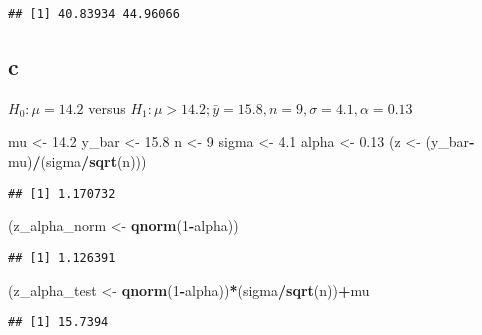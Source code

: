 \documentclass[]{article}
\newenvironment{Shaded}{\begin{snugshade}}{\end{snugshade}}
\newcommand{\KeywordTok}[1]{\textcolor[rgb]{0.13,0.29,0.53}{\textbf{#1}}}
\newcommand{\DecValTok}[1]{\textcolor[rgb]{0.00,0.00,0.81}{#1}}
\newcommand{\FloatTok}[1]{\textcolor[rgb]{0.00,0.00,0.81}{#1}}
\newcommand{\StringTok}[1]{\textcolor[rgb]{0.31,0.60,0.02}{#1}}
\newcommand{\OperatorTok}[1]{\textcolor[rgb]{0.81,0.36,0.00}{\textbf{#1}}}
\newcommand{\NormalTok}[1]{#1}
\begin{document}
\begin{verbatim}
## [1] 40.83934 44.96066
\end{verbatim}

\subsection{c}\label{c}

\(H_0 : \mu=14.2\) versus
\(H_1 : \mu > 14.2 ; \bar{y}=15.8 , n=9, \sigma = 4.1 , \alpha= 0.13\)

\begin{Shaded}
\begin{Highlighting}[]
\NormalTok{mu <-}\StringTok{ }\FloatTok{14.2}
\NormalTok{y_bar <-}\StringTok{ }\FloatTok{15.8}
\NormalTok{n <-}\StringTok{ }\DecValTok{9}
\NormalTok{sigma <-}\StringTok{ }\FloatTok{4.1}
\NormalTok{alpha <-}\StringTok{ }\FloatTok{0.13}
\NormalTok{(z <-}\StringTok{ }\NormalTok{(y_bar}\OperatorTok{-}\NormalTok{mu)}\OperatorTok{/}\NormalTok{(sigma}\OperatorTok{/}\KeywordTok{sqrt}\NormalTok{(n)))}
\end{Highlighting}
\end{Shaded}

\begin{verbatim}
## [1] 1.170732
\end{verbatim}

\begin{Shaded}
\begin{Highlighting}[]
\NormalTok{(z_alpha_norm <-}\StringTok{ }\KeywordTok{qnorm}\NormalTok{(}\DecValTok{1}\OperatorTok{-}\NormalTok{alpha))}
\end{Highlighting}
\end{Shaded}

\begin{verbatim}
## [1] 1.126391
\end{verbatim}

\begin{Shaded}
\begin{Highlighting}[]
\NormalTok{(z_alpha_test <-}\StringTok{ }\KeywordTok{qnorm}\NormalTok{(}\DecValTok{1}\OperatorTok{-}\NormalTok{alpha))}\OperatorTok{*}\NormalTok{(sigma}\OperatorTok{/}\KeywordTok{sqrt}\NormalTok{(n))}\OperatorTok{+}\NormalTok{mu}
\end{Highlighting}
\end{Shaded}

\begin{verbatim}
## [1] 15.7394
\end{verbatim}
\end{document}
